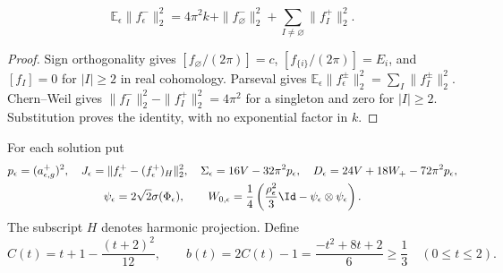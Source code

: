 \begin{lemma}\label{webvar:walsh-identity}
\begin{equation}\label{webvar:walsh-energy}
 \mathbb E_\epsilon\|f_\epsilon^-\|_2^2
 =4\pi^2k+\|f_\varnothing^-\|_2^2
                   +\sum_{I\ne\varnothing}\|f_I^+\|_2^2.
\end{equation}
\end{lemma}
\begin{proof}
Sign orthogonality gives
$[f_\varnothing/(2\pi)]=c$, $[f_{\{i\}}/(2\pi)]=E_i$, and
$[f_I]=0$ for $|I|\ge2$ in real cohomology.  Parseval gives
$\mathbb E_\epsilon\|f_\epsilon^\pm\|_2^2=\sum_I\|f_I^\pm\|_2^2$.
Chern--Weil gives $\|f_I^-\|_2^2-\|f_I^+\|_2^2=4\pi^2$
for a singleton and zero for $|I|\ge2$.
Substitution proves the identity, with no exponential factor in $k$.
\end{proof}

For each solution put
\[
 \begin{gathered}
 p_\epsilon=(a_{\epsilon,g}^+)^2,\quad
 J_\epsilon=\|f_\epsilon^+-(f_\epsilon^+)_H\|_2^2,\quad
 \Sigma_\epsilon=16V-32\pi^2p_\epsilon,\quad
 D_\epsilon=24V+18W_+-72\pi^2p_\epsilon,\\
 \psi_\epsilon=2\sqrt2\sigma(\Phi_\epsilon),\qquad
 W_{0,\epsilon}=\frac14\left(\frac{\rho_\epsilon^2}{3}\Id
                         -\psi_\epsilon\otimes\psi_\epsilon\right).
 \end{gathered}
\]
The subscript $H$ denotes harmonic projection.  Define
\begin{equation}\label{webvar:amplitude-polynomials}
 C(t)=t+1-\frac{(t+2)^2}{12},\qquad
 b(t)=2C(t)-1=\frac{-t^2+8t+2}{6}\ge\frac13
 \quad(0\le t\le2).
\end{equation}

